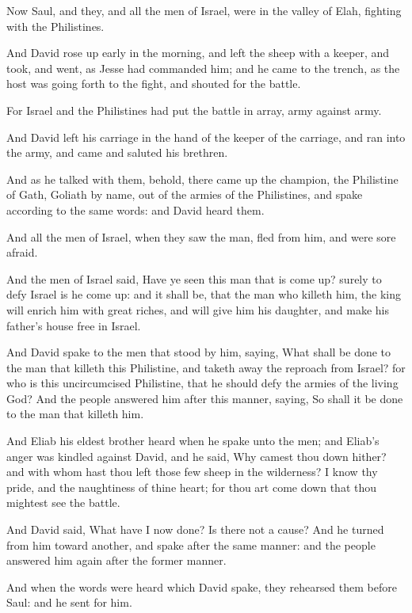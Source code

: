 \Verse Now Saul, and they, and all the men of Israel, were in the valley of Elah, fighting with the Philistines.

\Verse And David rose up early in the morning, and left the sheep with a keeper, and took, and went, as Jesse had commanded him; and he came to the trench, as the host was going forth to the fight, and shouted for the battle.

\Verse For Israel and the Philistines had put the battle in array, army against army.

\Verse And David left his carriage in the hand of the keeper of the carriage, and ran into the army, and came and saluted his brethren.

\Verse And as he talked with them, behold, there came up the champion, the Philistine of Gath, Goliath by name, out of the armies of the Philistines, and spake according to the same words: and David heard them.

\Verse And all the men of Israel, when they saw the man, fled from him, and were sore afraid.

\Verse And the men of Israel said, Have ye seen this man that is come up?  surely to defy Israel is he come up: and it shall be, that the man who killeth him, the king will enrich him with great riches, and will give him his daughter, and make his father's house free in Israel.

\Verse And David spake to the men that stood by him, saying, What shall be done to the man that killeth this Philistine, and taketh away the reproach from Israel? for who is this uncircumcised Philistine, that he should defy the armies of the living God?  \Verse And the people answered him after this manner, saying, So shall it be done to the man that killeth him.

\Verse And Eliab his eldest brother heard when he spake unto the men; and Eliab's anger was kindled against David, and he said, Why camest thou down hither? and with whom hast thou left those few sheep in the wilderness? I know thy pride, and the naughtiness of thine heart; for thou art come down that thou mightest see the battle.

\Verse And David said, What have I now done? Is there not a cause?  \Verse And he turned from him toward another, and spake after the same manner: and the people answered him again after the former manner.

\Verse And when the words were heard which David spake, they rehearsed them before Saul: and he sent for him.

